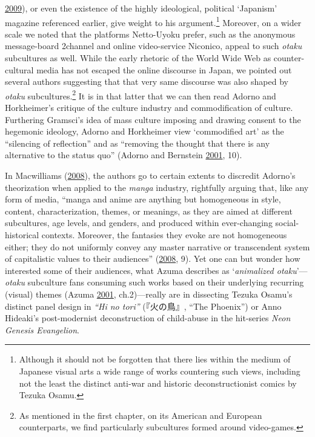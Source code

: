 \documentclass[10pt,british,A4paper,oneside]{memoir}
\begin{document}
\protect\hyperlink{ref-penney_nationalism_2009}{2009}), or even the
existence of the highly ideological, political `Japanism' magazine
referenced earlier, give weight to his argument.\footnote{Although it should not be forgotten that there lies within the medium of Japanese
  visual arts a wide range of works countering such views,
  including not the least the distinct anti-war and historic
  deconstructionist comics by Tezuka Osamu.} Moreover, on a wider scale
we noted that the platforms Netto-Uyoku prefer, such as the anonymous
message-board 2channel and online video-service Niconico, appeal to such
\emph{otaku} subcultures as well. While the early rhetoric of the World
Wide Web as counter-cultural media has not escaped the online discourse
in Japan, we pointed out several authors suggesting that that very same
discourse was also shaped by \emph{otaku} subcultures.\footnote{As mentioned in the first chapter, on its American and European
  counterparts, we find particularly subcultures formed around video-games.} It is in that latter that we can then read Adorno and
Horkheimer's critique of the culture industry and commodification of
culture. Furthering Gramsci's idea of mass culture imposing and drawing
consent to the hegemonic ideology, Adorno and Horkheimer view
`commodified art' as the ``silencing of reflection'' and as ``removing
the thought that there is any alternative to the status quo'' (Adorno
and Bernstein \protect\hyperlink{ref-adorno_culture_2001}{2001}, 10).

In Macwilliams
(\protect\hyperlink{ref-macwilliams_japanese_2008}{2008}), the authors
go to certain extents to discredit Adorno's theorization when applied to
the \emph{manga} industry, rightfully arguing that, like any form of
media, ``manga and anime are anything but homogeneous in style, content,
characterization, themes, or meanings, as they are aimed at different
subcultures, age levels, and genders, and produced within ever-changing
social-historical contexts. Moreover, the fantasies they evoke are not
homogeneous either; they do not uniformly convey any master narrative or
transcendent system of capitalistic values to their audiences''
(\protect\hyperlink{ref-macwilliams_japanese_2008}{2008}, 9). Yet one
can but wonder how interested some of their audiences, what Azuma
describes as `\emph{animalized otaku}'---\emph{otaku} subculture fans
consuming such works based on their underlying recurring (visual) themes
(Azuma \protect\hyperlink{ref-azuma_otaku:_2001}{2001}, ch.2)---really
are in dissecting Tezuka Osamu's distinct panel design in \emph{``Hi no
tori''} (『火の鳥』, ``The Phoenix'') or Anno Hideaki's post-modernist
deconstruction of child-abuse in the hit-series \emph{Neon Genesis
Evangelion}.
\end{document}
